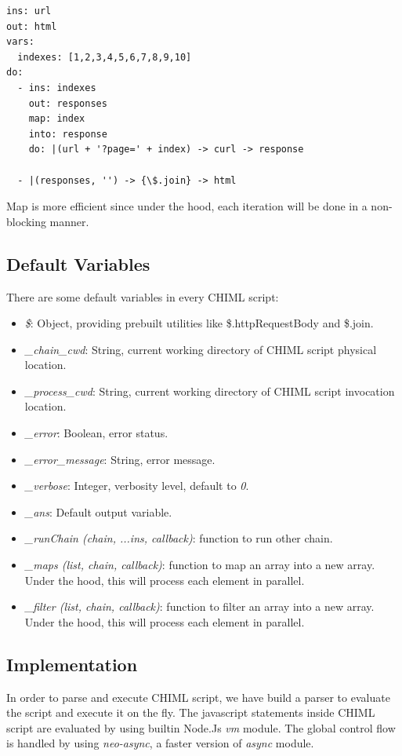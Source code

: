 \documentclass[conference]{IEEEtran}
\begin{document}
\begin{lstlisting}[caption=CHIML Map Feature, label=chimlMap, basicstyle=\footnotesize, breaklines=true]
ins: url
out: html
vars:
  indexes: [1,2,3,4,5,6,7,8,9,10]
do:
  - ins: indexes 
    out: responses
    map: index
    into: response
    do: |(url + '?page=' + index) -> curl -> response

  - |(responses, '') -> {\$.join} -> html
\end{lstlisting}

Map is more efficient since under the hood, each iteration will be done in a non-blocking manner.

\subsection{Default Variables}
There are some default variables in every CHIML script:

\begin{itemize}
  \item {\it\$}: Object, providing prebuilt utilities like {\lt \$.httpRequestBody} and {\lt \$.join}.
  \item {\it\_chain\_cwd}: String, current working directory of CHIML script physical location.
  \item {\it\_process\_cwd}: String, current working directory of CHIML script invocation location.
  \item {\it\_error}: Boolean, error status.
  \item {\it\_error\_message}: String, error message.
  \item {\it\_verbose}: Integer, verbosity level, default to {\it0}.
  \item {\it\_ans}: Default output variable.
  \item {\it\_runChain (chain, ...ins, callback)}: function to run other chain.
  \item {\it\_maps (list, chain, callback)}: function to map an array into a new array. Under the hood, this will process each element in parallel.
  \item {\it\_filter (list, chain, callback)}: function to filter an array into a new array. Under the hood, this will process each element in parallel.
\end{itemize}

\subsection{Implementation}
In order to parse and execute CHIML script, we have build a parser to evaluate the script and execute it on the fly. The javascript statements inside CHIML script are evaluated by using builtin Node.Js {\it vm} module. The global control flow is handled by using {\it neo-async}, a faster version of {\it async} module.
\end{document}
